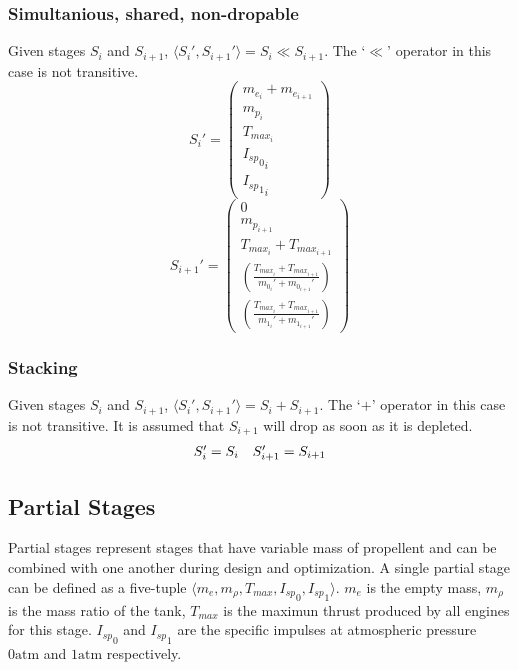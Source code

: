 \subsubsection{Simultanious, shared, non-dropable}
Given stages $S_{i}$ and $S_{i+1}$, $\langle S_{i}', S_{i+1}' \rangle = S_{i} \ll S_{i+1}$.
The `$\ll$' operator in this case is not transitive.
\begin{equation}
    S_{i}' =
        \begin{pmatrix}
            m_{e_{i}} + m_{e_{i+1}} \\
            m_{p_{i}} \\
            T_{max_{i}} \\
            {{I_{sp}}_{0}}_i \\
            {{I_{sp}}_{1}}_i
        \end{pmatrix}
\end{equation}
\begin{equation}
    S_{i+1}' =
        \begin{pmatrix}
            0 \\
            m_{p_{i+1}} \\
            T_{max_{i}} + T_{max_{i+1}} \\
            \left(\frac{T_{max_{i}} + T_{max_{i+1}}}{m_{0_i}'+m_{0_{i+1}}'}\right) \\
            \left(\frac{T_{max_{i}} + T_{max_{i+1}}}{m_{1_i}'+m_{1_{i+1}}'}\right)
        \end{pmatrix}
\end{equation}

\subsubsection{Stacking}
Given stages $S_{i}$ and $S_{i+1}$, $\langle S_{i}', S_{i+1}' \rangle = S_{i} + S_{i+1}$.
The `$+$' operator in this case is not transitive.
It is assumed that $S_{i+1}$ will drop as soon as it is depleted.
\begin{equation}
    \begin{array}{c c}
        S_{i}' = S_{i} &
        S_{i+1}' = S_{i+1}
    \end{array}
\end{equation}

\subsection{Partial Stages}
Partial stages represent stages that have variable mass of propellent and can be combined with one another during design
and optimization. A single partial stage can be defined as a five-tuple $\langle m_e, m_{\rho}, T_{max}, {I_{sp}}_0, {I_{sp}}_1 \rangle$.
$m_e$ is the empty mass, $m_{\rho}$ is the mass ratio of the tank, $T_{max}$ is the maximun thrust produced by all engines
for this stage. ${I_{sp}}_0$ and ${I_{sp}}_1$ are the specific impulses at atmospheric pressure $0\mathrm{atm}$ and
$1\mathrm{atm}$ respectively.
